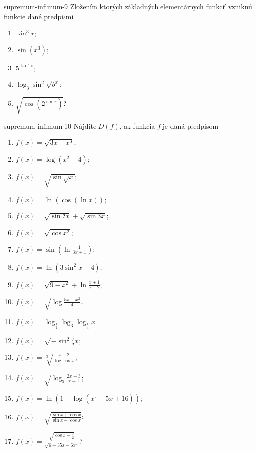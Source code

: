 \begin{defproblem}{supremum-infimum-9}
Zložením ktorých základných elementárnych funkcií vzniknú funkcie dané predpismi
\begin{multicols}{2}
\begin{enumerate}
    \item $\sin^3 x$;
    \item $\sin (x^3)$;
    \item $5^{\tan^2 x}$;
    \item $\log_3 \sin^2 \sqrt{b^x}$;
    \item $\sqrt{\cos (2^{\sin x})}$?
\end{enumerate}
\end{multicols}
\end{defproblem}

\begin{defproblem}{supremum-infimum-10}
Nájdite $D(f)$, ak funkcia $f$ je daná predpisom
\begin{multicols}{2}
\begin{enumerate}
    \item $f(x)=\sqrt{3x-x^3}$;
    \item $f(x)=\log(x^2-4)$;
    \item $f(x)=\sqrt{\sin \sqrt{x}}$;
    \item $f(x)=\ln (\cos (\ln x))$;
    \item $f(x)=\sqrt{\sin 2x}+\sqrt{\sin 3x}$;
    \item $f(x)=\sqrt{\cos x^2}$;
    \item $f(x)=\sin (\ln \frac{1}{3x+1})$;
    \item $f(x)=\ln (3\sin^2 x -4)$;
    \item $f(x)=\sqrt{9-x^2}+\ln \frac{x+1}{x-2}$;
    \item $f(x)=\sqrt{\log \frac{5x-x^2}{4}}$;
    \item $f(x)=\log_\frac{1}{2}\log_3 \log_\frac{1}{4} x$;
    \item $f(x)=\sqrt{-\sin^2 \zeta x}$;
    \item $f(x)=\sqrt[3]{\frac{x+2}{\log\cos x}}$;
    \item $f(x)=\sqrt{\log_3 \frac{2x-3}{x-1}}$;
    \item $f(x)=\ln (1-\log (x^2-5x+16))$;
    \item $f(x)=\sqrt{\frac{\sin x +\cos x}{\sin x -\cos x}}$;
    \item $f(x)=\frac{\sqrt{\cos x -\frac{1}{2}}}{\sqrt{6-35x-6x^2}}$?
\end{enumerate}
\end{multicols}
\end{defproblem}

